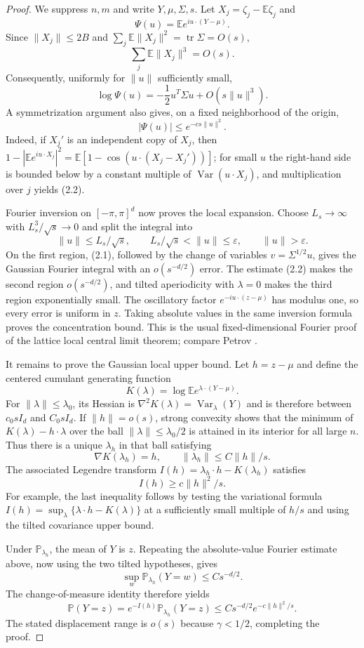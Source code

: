 \documentclass[11pt]{article}
\theoremstyle{remark}
\newcommand{\Pp}{\mathbb P}
\newcommand{\Ee}{\mathbb E}
\newcommand{\Var}{\operatorname{Var}}
\begin{document}
\begin{proof}
We suppress $n,m$ and write $Y,\mu,\Sigma,s$.  Let
$X_j=\zeta_j-\Ee\zeta_j$ and
\[
        \Psi(u)=\Ee e^{iu\cdot(Y-\mu)}.
\]
Since $\|X_j\|\le2B$ and
$\sum_j\Ee\|X_j\|^2=\operatorname{tr}\Sigma=O(s)$,
\[
        \sum_j\Ee\|X_j\|^3=O(s).
\]
Consequently, uniformly for $\|u\|$ sufficiently small,
\[
        \log\Psi(u)=-\frac12u^T\Sigma u+O(s\|u\|^3).
        \tag{2.1}
\]
A symmetrization argument also gives, on a fixed neighborhood of the origin,
\[
        |\Psi(u)|\le e^{-cs\|u\|^2}.
        \tag{2.2}
\]
Indeed, if $X_j'$ is an independent copy of $X_j$, then
$1-|\Ee e^{iu\cdot X_j}|^2=
\Ee[1-\cos(u\cdot(X_j-X_j'))]$; for small $u$ the right-hand side is
bounded below by a constant multiple of $\Var(u\cdot X_j)$, and multiplication
over $j$ yields (2.2).

Fourier inversion on $[-\pi,\pi]^d$ now proves the local expansion.  Choose
$L_s\to\infty$ with $L_s^3/\sqrt{s}\to0$ and split the integral into
\[
 \|u\|\le L_s/\sqrt{s},\qquad
 L_s/\sqrt{s}<\|u\|\le\varepsilon,
 \qquad \|u\|>\varepsilon.
\]
On the first region, (2.1), followed by the change of variables
$v=\Sigma^{1/2}u$, gives the Gaussian Fourier integral with an
$o(s^{-d/2})$ error.  The estimate (2.2) makes the second region
$o(s^{-d/2})$, and tilted aperiodicity with $\lambda=0$ makes the third
region exponentially small.  The oscillatory factor
$e^{-iu\cdot(z-\mu)}$ has modulus one, so every error is uniform in $z$.
Taking absolute values in the same inversion formula proves the concentration
bound.  This is the usual fixed-dimensional Fourier proof of the lattice local
central limit theorem; compare Petrov \cite[Chapter~VII]{Petrov1975}.

It remains to prove the Gaussian local upper bound.  Let
$h=z-\mu$ and define the centered cumulant generating function
\[
        K(\lambda)=\log\Ee e^{\lambda\cdot(Y-\mu)}.
\]
For $\|\lambda\|\le\lambda_0$, its Hessian is
$\nabla^2K(\lambda)=\Var_\lambda(Y)$ and is therefore between
$c_0sI_d$ and $C_0sI_d$.  If $\|h\|=o(s)$, strong convexity shows that the
minimum of $K(\lambda)-h\cdot\lambda$ over the ball
$\|\lambda\|\le\lambda_0/2$ is attained in its interior for all large $n$.
Thus there is a unique $\lambda_h$ in that ball satisfying
\[
        \nabla K(\lambda_h)=h,
        \qquad \|\lambda_h\|\le C\|h\|/s.
\]
The associated Legendre transform
$I(h)=\lambda_h\cdot h-K(\lambda_h)$ satisfies
\[
        I(h)\ge c\|h\|^2/s.
\]
For example, the last inequality follows by testing the variational formula
$I(h)=\sup_\lambda\{\lambda\cdot h-K(\lambda)\}$ at a sufficiently small
multiple of $h/s$ and using the tilted covariance upper bound.

Under $\Pp_{\lambda_h}$, the mean of $Y$ is $z$.  Repeating the absolute-value
Fourier estimate above, now using the two tilted hypotheses, gives
\[
        \sup_w\Pp_{\lambda_h}(Y=w)\le Cs^{-d/2}.
\]
The change-of-measure identity therefore yields
\[
 \Pp(Y=z)=e^{-I(h)}\Pp_{\lambda_h}(Y=z)
 \le Cs^{-d/2}e^{-c\|h\|^2/s}.
\]
The stated displacement range is $o(s)$ because $\gamma<1/2$, completing the
proof.
\end{proof}
\end{document}
